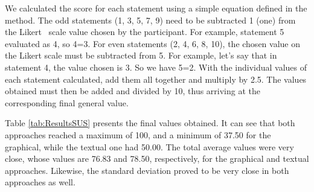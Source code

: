 We calculated the score for each statement using a simple equation defined in the method.
The odd statements (1, 3, 5, 7, 9) need to be subtracted 1 (one) from the Likert~\cite{Likert} scale value chosen by the participant.
For example, statement 5 evaluated as 4, so 4=3.
For even statements (2, 4, 6, 8, 10), the chosen value on the Likert scale must be subtracted from 5.
For example, let's say that in statement 4, the value chosen is 3.
So we have 5=2.
With the individual values of each statement calculated, add them all together and multiply by 2.5.
The values obtained must then be added and divided by 10, thus arriving at the corresponding final general value.

Table \ref{tab:ResultsSUS} presents the final values obtained.
It can see that both approaches reached a maximum of 100, and a minimum of 37.50 for the graphical, while the textual one had 50.00.
The total average values were very close, whose values are 76.83 and 78.50, respectively, for the graphical and textual approaches.
Likewise, the standard deviation proved to be very close in both approaches as well.

